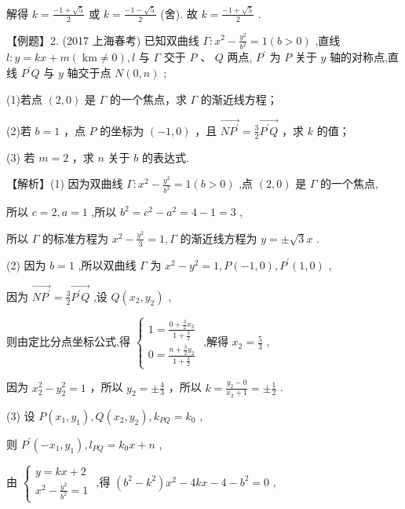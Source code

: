 \documentclass[10pt]{article}
\begin{document}
解得 \(k = \frac{-1 + \sqrt{5}}{2}\) 或 \(k = \frac{-1 - \sqrt{5}}{2}\) (舍). 故 \(k = \frac{-1 + \sqrt{5}}{2}\) .

【例题】2. (2017 上海春考) 已知双曲线 \(\Gamma  : {x}^{2} - \frac{{y}^{2}}{{b}^{2}} = 1\left( {b > 0}\right)\) ,直线 \(l : y = {kx} + m\left( {\mathrm{\;{km}} \neq  0}\right) ,l\) 与 \(\Gamma\) 交于 \(P\text{ 、 }Q\) 两点, \({P}^{\prime }\) 为 \(P\) 关于 \(y\) 轴的对称点,直线 \({P}^{\prime }Q\) 与 \(y\) 轴交于点 \(N\left( {0,n}\right)\) ;

(1)若点 \(\left( {2,0}\right)\) 是 \(\Gamma\) 的一个焦点，求 \(\Gamma\) 的渐近线方程；

(2)若 \(b = 1\) ，点 \(P\) 的坐标为 \(\left( {-1,0}\right)\) ，且 \(\overrightarrow{N{P}^{\prime }} = \frac{3}{2}\overrightarrow{{P}^{\prime }Q}\) ，求 \(k\) 的值；

(3) 若 \(m = 2\) ，求 \(n\) 关于 \(b\) 的表达式.

【解析】(1) 因为双曲线 \(\Gamma  : {x}^{2} - \frac{{y}^{2}}{{b}^{2}} = 1\left( {b > 0}\right)\) ,点 \(\left( {2,0}\right)\) 是 \(\Gamma\) 的一个焦点,

所以 \(c = 2,a = 1\) ,所以 \({b}^{2} = {c}^{2} - {a}^{2} = 4 - 1 = 3\) ,

所以 \(\Gamma\) 的标准方程为 \({x}^{2} - \frac{{y}^{2}}{3} = 1,\Gamma\) 的渐近线方程为 \(y =  \pm  \sqrt{3}x\) .

(2) 因为 \(b = 1\) ,所以双曲线 \(\Gamma\) 为 \({x}^{2} - {y}^{2} = 1,P\left( {-1,0}\right) ,{P}^{\prime }\left( {1,0}\right)\) ,

因为 \(\overrightarrow{N{P}^{\prime }} = \frac{3}{2}\overrightarrow{{P}^{\prime }Q}\) ,设 \(Q\left( {{x}_{2},{y}_{2}}\right)\) ,

则由定比分点坐标公式,得 \(\left\{  \begin{array}{l} 1 = \frac{0 + \frac{3}{2}{x}_{2}}{1 + \frac{3}{2}} \\  0 = \frac{n + \frac{3}{2}{y}_{2}}{1 + \frac{3}{2}} \end{array}\right.\) ,解得 \({x}_{2} = \frac{5}{3}\) ,

因为 \({x}_{2}^{2} - {y}_{2}^{2} = 1\) ，所以 \({y}_{2} =  \pm  \frac{4}{3}\) ，所以 \(k = \frac{{y}_{2} - 0}{{x}_{2} + 1} =  \pm  \frac{1}{2}\) .

(3) 设 \(P\left( {{x}_{1},{y}_{1}}\right) ,Q\left( {{x}_{2},{y}_{2}}\right) ,{k}_{PQ} = {k}_{0}\) ,

则 \({P}^{\prime }\left( {-{x}_{1},{y}_{1}}\right) ,{l}_{PQ} = {k}_{0}x + n\) ,

由 \(\left\{  \begin{array}{l} y = {kx} + 2 \\  {x}^{2} - \frac{{y}^{2}}{{b}^{2}} = 1 \end{array}\right.\) ,得 \(\left( {{b}^{2} - {k}^{2}}\right) {x}^{2} - {4kx} - 4 - {b}^{2} = 0\) ,
\end{document}
